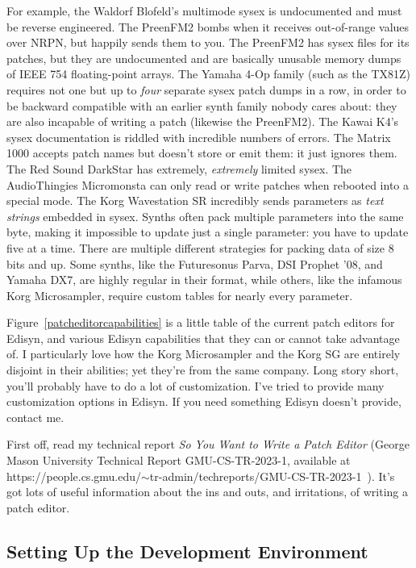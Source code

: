 \documentclass{article}
\begin{document}
For example, the Waldorf Blofeld's multimode sysex is undocumented and must be reverse engineered.  The PreenFM2 bombs when it receives out-of-range values over NRPN, but happily sends them to you.  The PreenFM2 has sysex files for its patches, but they are undocumented and are basically unusable memory dumps  of IEEE 754 floating-point arrays.  The Yamaha 4-Op family (such as the TX81Z) requires not one but up to {\it four} separate sysex patch dumps in a row, in order to be backward compatible with an earlier synth family nobody cares about: they are also incapable of writing a patch (likewise the PreenFM2).    The Kawai K4's sysex documentation is riddled with incredible numbers of errors.    The Matrix 1000 accepts patch names but doesn't store or emit them: it just ignores them.  The Red Sound DarkStar has extremely, {\it extremely} limited sysex.  The  AudioThingies Micromonsta can only read or write patches when rebooted into a special mode.  The Korg Wavestation SR incredibly sends parameters as {\it text strings} embedded in sysex.  Synths often pack multiple parameters into the same byte, making it impossible to update just a single parameter: you have to update five at a time.  There are multiple different strategies for packing data of size 8 bits and up.  Some synths, like the Futuresonus Parva, DSI Prophet '08, and Yamaha DX7, are highly regular in their format, while others, like the infamous Korg Microsampler, require custom tables for nearly every parameter.

Figure~\ref{patcheditorcapabilities} is a little table of the current patch editors for Edisyn, and various Edisyn capabilities that they can or cannot take advantage of.  I particularly love how the Korg Microsampler and the Korg SG are entirely disjoint in their abilities; yet they're from the same company.   Long story short, you'll probably have to do a lot of customization.  I've tried to provide many customization options in Edisyn.  If you need something Edisyn doesn't provide, contact me.

First off, read my technical report {\it So You Want to Write a Patch Editor} (George Mason University Technical Report GMU-CS-TR-2023-1, available at https:/\!/people.cs.gmu.edu/\(\sim\)tr-admin/techreports/GMU-CS-TR-2023-1~).  It's got lots of useful information about the ins and outs, and irritations, of writing a patch editor.

\subsection{Setting Up the Development Environment}
\end{document}
